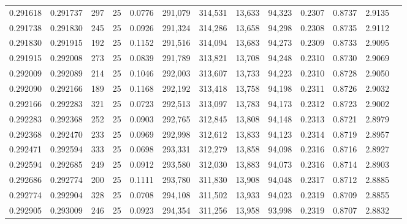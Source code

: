 \begin{tabular}{rrrrrrrrrrrrr}
0.291618 & 0.291737 &   297 &  25 &                                     0.0776 & 291,079 & 314,531 &  13,633 &  94,323 & 0.2307 & 0.8737 & 2.9135 \\
0.291738 & 0.291830 &   245 &  25 &                                     0.0926 & 291,324 & 314,286 &  13,658 &  94,298 & 0.2308 & 0.8735 & 2.9112 \\
0.291830 & 0.291915 &   192 &  25 &                                     0.1152 & 291,516 & 314,094 &  13,683 &  94,273 & 0.2309 & 0.8733 & 2.9095 \\
0.291915 & 0.292008 &   273 &  25 &                                     0.0839 & 291,789 & 313,821 &  13,708 &  94,248 & 0.2310 & 0.8730 & 2.9069 \\
0.292009 & 0.292089 &   214 &  25 &                                     0.1046 & 292,003 & 313,607 &  13,733 &  94,223 & 0.2310 & 0.8728 & 2.9050 \\
0.292090 & 0.292166 &   189 &  25 &                                     0.1168 & 292,192 & 313,418 &  13,758 &  94,198 & 0.2311 & 0.8726 & 2.9032 \\
0.292166 & 0.292283 &   321 &  25 &                                     0.0723 & 292,513 & 313,097 &  13,783 &  94,173 & 0.2312 & 0.8723 & 2.9002 \\
0.292283 & 0.292368 &   252 &  25 &                                     0.0903 & 292,765 & 312,845 &  13,808 &  94,148 & 0.2313 & 0.8721 & 2.8979 \\
0.292368 & 0.292470 &   233 &  25 &                                     0.0969 & 292,998 & 312,612 &  13,833 &  94,123 & 0.2314 & 0.8719 & 2.8957 \\
0.292471 & 0.292594 &   333 &  25 &                                     0.0698 & 293,331 & 312,279 &  13,858 &  94,098 & 0.2316 & 0.8716 & 2.8927 \\
0.292594 & 0.292685 &   249 &  25 &                                     0.0912 & 293,580 & 312,030 &  13,883 &  94,073 & 0.2316 & 0.8714 & 2.8903 \\
0.292686 & 0.292774 &   200 &  25 &                                     0.1111 & 293,780 & 311,830 &  13,908 &  94,048 & 0.2317 & 0.8712 & 2.8885 \\
0.292774 & 0.292904 &   328 &  25 &                                     0.0708 & 294,108 & 311,502 &  13,933 &  94,023 & 0.2319 & 0.8709 & 2.8855 \\
0.292905 & 0.293009 &   246 &  25 &                                     0.0923 & 294,354 & 311,256 &  13,958 &  93,998 & 0.2319 & 0.8707 & 2.8832 \\

\end{tabular}
